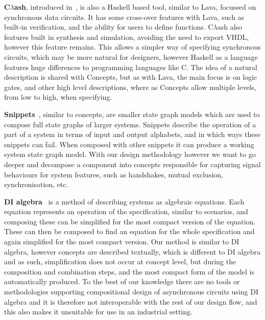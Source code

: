 \documentclass[british, journal]{IEEEtran}
\newcommand{\noun}[1]{\textsc{#1}}
\begin{document}
\textbf{C$\lambda$ash}, introduced in~\cite{baaij2009clambdaash},  is also a Haskell
based tool, similar to Lava, focussed on synchronous data circuits.  It has some
cross-over features with Lava, such as built-in verification, and the ability for
users to define functions.
C$\lambda$ash also features built in synthesis and simulation, avoiding the need to export VHDL, however this feature remains. This allows a simpler way of
specifying synchronous circuits, which may be more natural for designers,
however Haskell as a language features huge differences to programming languages
like \noun{C}. The idea of a natural description is shared with Concepts,
but as with Lava, the main focus is on logic gates, and other high level descriptions, where as Concepts allow multiple levels, from low to high, when specifying.

\textbf{Snippets}~\cite{raey}, similar to concepts, are smaller
state graph models which are used to compose full state graphs of
larger systems. Snippets describe the operation of a part of a system
in terms of input and output alphabets, and in which ways these snippets
can fail. When composed with other snippets it can produce a working
system state graph model. With our design methodology however we want
to go deeper and decompose a component into concepts responsible for
capturing signal behaviours for system features, such as handshakes,
mutual exclusion, synchronisation, etc.

\textbf{DI algebra}~\cite{josephs1993overview} is a method of describing
systems as algebraic equations. Each equation represents an operation
of the specification, similar to scenarios, and composing these can
be simplified for the most compact version of the equation. These
can then be composed to find an equation for the whole specification
and again simplified for the most compact version. Our method is similar
to DI algebra, however concepts are described textually, which is
different to DI algebra and as such, simplification does not occur
at concept level, but during the composition and combination steps,
and the most compact form of the model is automatically produced.
To the best of our knowledge there are no tools or methodologies supporting
compositional design of asynchronous circuits using DI algebra and
it is therefore not interoperable with the rest of our design flow,
and this also makes it unsuitable for use in an industrial setting.
\end{document}
